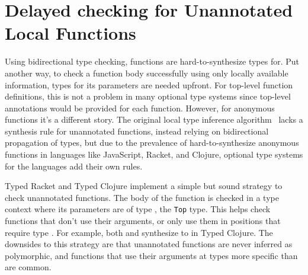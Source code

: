 
\chapter{Delayed checking for Unannotated Local Functions}
\label{chapter:symbolic:symbolic-closures}

Using bidirectional type checking, functions are hard-to-synthesize types for.
Put another way, to check a function body successfully using only locally available information,
types for its parameters are needed upfront.
For top-level function definitions, this is not a problem in many
optional type systems since top-level annotations would be provided
for each function.
However, for anonymous functions it's a different story.
The original local type inference algorithm~\cite{PierceLTI}
lacks a synthesis rule for unannotated functions, instead relying on bidirectional
propagation of types,
but due to the prevalence
of hard-to-synthesize anonymous functions in languages like JavaScript, Racket, and Clojure,
optional type systems for the languages add their own rules.

Typed Racket and Typed Clojure implement a simple but sound strategy
to check unannotated functions. The body of the function is checked
in a type context where its parameters are of type ,
the \texttt{Top} type.
This helps check functions that don't use their arguments, or only
use them in positions that require type .
For example, both  and  
synthesize to  in Typed Clojure.
The downsides to this strategy are that unannotated functions are never
inferred as polymorphic, and functions that use their arguments
at types more specific than  are common.

